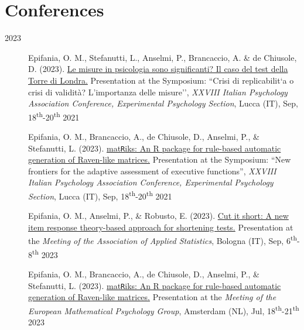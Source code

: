 \documentclass[letterpaper,12pt]{article}
\begin{document}
\section{Conferences}
\begin{description}
	
	\item[2023] 
	
			\item[] Epifania, O. M., Stefanutti, L.,  Anselmi, P., Brancaccio, A. \& de Chiusole, D. (2023). \href{https://ottaviae.github.io/presentations/AIP2023/Simposio-validita/epifania-meaningfullness.pdf}{Le misure in psicologia sono significanti?
				Il caso del test della Torre di Londra.} Presentation at the Symposium: ``Crisi di replicabilit`a o crisi di validità? L’importanza delle misure'',   \emph{XXVIII Italian Psychology Association Conference, Experimental Psychology Section}, Lucca (IT), Sep, 18\textsuperscript{th}-20\textsuperscript{th} 2021
	
		\item[] Epifania, O. M., Brancaccio, A., de Chiusole, D., Anselmi, P., \& Stefanutti, L. (2023). \href{https://ottaviae.github.io/presentations/AIP2023/Simposio-PRIN/AIP-2023-epifania-matRiks.pdf}{mat\texttt{R}iks: An R package for rule-based automatic generation of Raven-like matrices.} Presentation at the Symposium: ``New frontiers for the adaptive assessment of executive functions'',   \emph{XXVIII Italian Psychology Association Conference, Experimental Psychology Section}, Lucca (IT), Sep, 18\textsuperscript{th}-20\textsuperscript{th} 2021
	
		\item[] Epifania, O. M., Anselmi, P., \& Robusto, E. (2023). \href{https://ottaviae.github.io/presentations/Bologna2023/Cut-it-short.pdf}{Cut it short: A new item response theory-based approach for shortening tests.} Presentation at the \emph{Meeting of the Association of Applied Statistics},  Bologna (IT), Sep, 6\textsuperscript{th}-8\textsuperscript{th} 2023
	
	\item[] Epifania, O. M., Brancaccio, A., de Chiusole, D., Anselmi, P., \& Stefanutti, L. (2023). \href{https://ottaviae.github.io/presentations/empg2023/empg2023-Epifania.pdf}{mat\texttt{R}iks: An R package for rule-based automatic generation of Raven-like matrices.} Presentation at the \emph{Meeting of the European Mathematical Psychology Group},  Amsterdam (NL), Jul, 18\textsuperscript{th}-21\textsuperscript{th} 2023
	

\end{description}
\end{document}
